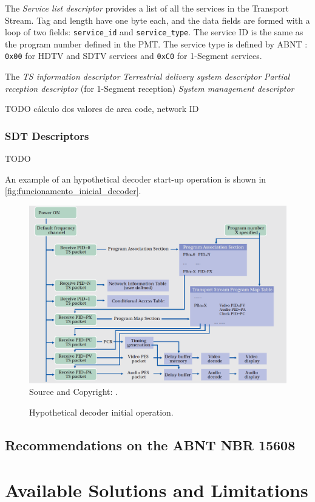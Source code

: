 \documentclass[
	12pt,				%
	openright,			%
	twoside,			%
	a4paper,			%
	brazil,
	french,				%
	english
	]{abntex2}
\begin{document}
The \textit{Service list descriptor} provides a list of all the services in the Transport Stream. Tag and length have one byte each, and the data fields are formed with a loop of two fields: \texttt{service\_id} and \texttt{service\_type}. The service ID is the same as the program number defined in the PMT. The service type is defined by ABNT : \texttt{0x00} for HDTV and SDTV services and \texttt{0xC0} for 1-Segment services.

The \textit{TS information descriptor}
\textit{Terrestrial delivery system descriptor}
\textit{Partial reception descriptor} (for 1-Segment reception)
\textit{System management descriptor}

TODO cálculo dos valores de area code, network ID

\subsection{SDT Descriptors}
\label{nit_descriptors}
TODO

An example of an hypothetical decoder start-up operation is shown in \autoref{fig:funcionamento_inicial_decoder}.

\begin{figure}[!hb]
\centering
\caption{Hypothetical decoder initial operation.}
\includegraphics[width=0.8\linewidth]{figuras/funcionamento_inicial_decoder.png}
\\Source and Copyright: \cite{nhk}.
\label{fig:funcionamento_inicial_decoder}
\end{figure}

\section{Recommendations on the ABNT NBR 15608}


\chapter{Available Solutions and Limitations}
\end{document}

